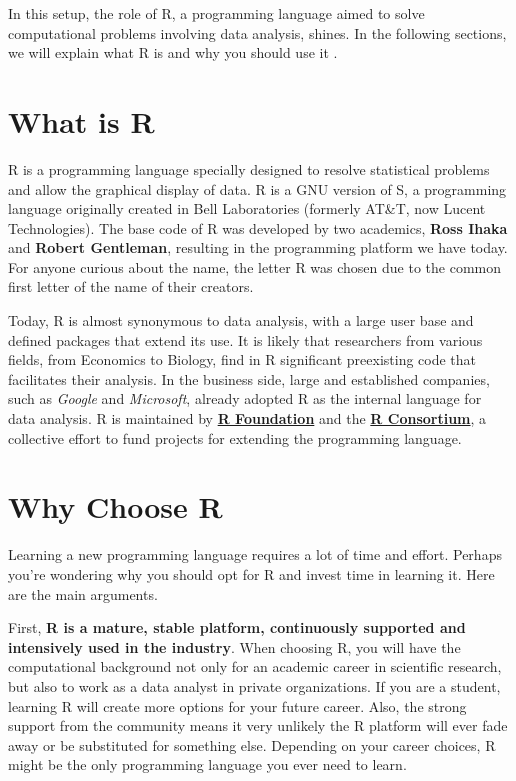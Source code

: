 \documentclass[11pt,]{book}
\begin{document}
In this setup, the role of R, a programming language aimed to solve
computational problems involving data analysis, shines. In the following
sections, we will explain what R is and why you should use it .

\section{What is R}\label{what-is-r}

R is a programming language specially designed to resolve statistical
problems and allow the graphical display of data. R is a GNU version of
S, a programming language originally created in Bell Laboratories
(formerly AT\&T, now Lucent Technologies). The base code of R was
developed by two academics, \textbf{Ross Ihaka} and \textbf{Robert
Gentleman}, resulting in the programming platform we have today. For
anyone curious about the name, the letter R was chosen due to the common
first letter of the name of their creators. 

Today, R is almost synonymous to data analysis, with a large user base
and defined packages that extend its use. It is likely that researchers
from various fields, from Economics to Biology, find in R significant
preexisting code that facilitates their analysis. In the business side,
large and established companies, such as \emph{Google} and
\emph{Microsoft}, already adopted R as the internal language for data
analysis. R is maintained by
\href{https://www.r-project.org/foundation/}{\textbf{R Foundation}} and
the \href{https://www.r-consortium.org/}{\textbf{R Consortium}}, a
collective effort to fund projects for extending the programming
language.  

\section{Why Choose R}\label{why-choose-r}

Learning a new programming language requires a lot of time and effort.
Perhaps you're wondering why you should opt for R and invest time in
learning it. Here are the main arguments.

First, \textbf{R is a mature, stable platform, continuously supported
and intensively used in the industry}. When choosing R, you will have
the computational background not only for an academic career in
scientific research, but also to work as a data analyst in private
organizations. If you are a student, learning R will create more options
for your future career. Also, the strong support from the community
means it very unlikely the R platform will ever fade away or be
substituted for something else. Depending on your career choices, R
might be the only programming language you ever need to learn.
\end{document}
